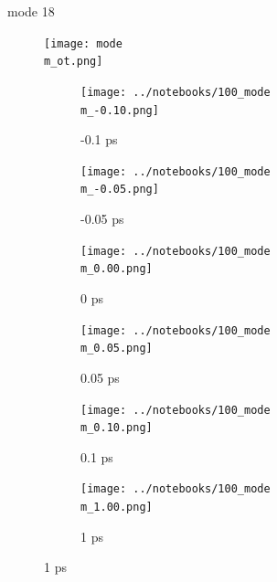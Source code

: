 \documentclass{beamer}
\begin{document}
\renewcommand\m{18}
\begin{frame}{mode \m}
				\vspace{\vh mm}
	\begin{figure}
		\centering
		\texttt{[image: mode\\m\_ot.png]}
	\end{figure}
	\begin{figure}
		\centering
		\begin{subfigure}[b]{\w\textwidth}
			\centering
			\texttt{[image: ../notebooks/100\_mode\\m\_-0.10.png]}
			\caption{-0.1 ps}
		\end{subfigure}
		\begin{subfigure}[b]{\w\textwidth}
			\centering
			\texttt{[image: ../notebooks/100\_mode\\m\_-0.05.png]}
			\caption{-0.05 ps}
		\end{subfigure}
		\begin{subfigure}[b]{\w\textwidth}
			\centering
			\texttt{[image: ../notebooks/100\_mode\\m\_0.00.png]}
			\caption{0 ps}
		\end{subfigure}
		\begin{subfigure}[b]{\w\textwidth}
			\centering
			\texttt{[image: ../notebooks/100\_mode\\m\_0.05.png]}
			\caption{0.05 ps}
		\end{subfigure}
		\begin{subfigure}[b]{\w\textwidth}
			\centering
			\texttt{[image: ../notebooks/100\_mode\\m\_0.10.png]}
			\caption{0.1 ps}
		\end{subfigure}
		\begin{subfigure}[b]{\w\textwidth}
			\centering
			\texttt{[image: ../notebooks/100\_mode\\m\_1.00.png]}
			\caption{1 ps}
		\end{subfigure}
	\end{figure}
\end{frame}
\end{document}

